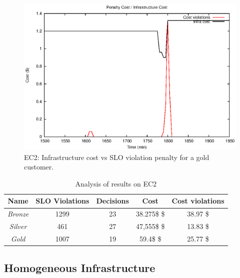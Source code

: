 \begin{figure}
  \begin{center}
    \includegraphics[width=.85\linewidth]{images/exps2011/high/ec2/penaltyVScost_filtered.eps}
  \end{center}
\vspace{-5mm}
  \caption{EC2: Infrastructure cost vs SLO violation penalty for a gold customer.}
  \label{highPenalty}
\end{figure}

\begin{table}\label{summaryEC2}
  {\scriptsize 
\begin{center}
    \begin{tabular}{  | c | c | c | c | c |}
    \hline
         \textbf{Name}  & \textbf{SLO Violations} & \textbf{Decisions}  & \textbf{Cost}  & \textbf{Cost violations} \\ \hline
   \textit{Bronze}   &  1299 &  23 &  38.275\$ \$ & 38.97 \$ \\ \hline   
   \textit{Silver}  &  461 &  27 &  47,555\$ \$ &  13.83 \$ \\ \hline   
\textit{Gold} &   1007  &  19 &  59.4\$ \$ & 25.77 \$ \\ \hline   

 \end{tabular}
\end{center}
\vspace{-5mm}
\caption{Analysis of results on EC2}
\label{summaryEC2}
}
\end{table}



\subsection{Homogeneous Infrastructure}

